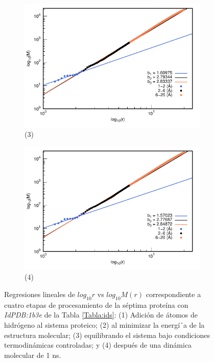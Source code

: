 \begin{figure}[H]
			\vspace{0cm} %
			
			\hspace{-0.3cm} 
			\begin{subfigure}{0.49\textwidth}
				\centering
				\includegraphics[width=\linewidth,page=1]{graphs/PDBs/1b3e/1b3eEq.pdf}
				\caption{(3)}
			\end{subfigure}
			\hspace{0.2cm}
			\begin{subfigure}{0.49\textwidth} %
				\centering
				\includegraphics[width=\linewidth,page=1]{graphs/PDBs/1b3e/1b3e1ns.pdf}
				\caption{(4)}
			\end{subfigure}
			\caption{Regresiones lineales de $log_{10}r$ vs $log_{10}M(r)$ correspondiente a cuatro etapas de procesamiento de la s\'{e}ptima prote\'{i}na con \textit{IdPDB:1b3e} de la Tabla \ref{Tabla:ids}: (1) Adici\'{o}n de \'{a}tomos de hidr\'{o}geno al sistema proteico; (2) al minimizar la energ\'{i´}a de la estructura molecular; (3) equilibrando el sistema bajo condiciones termodin\'{a}micas controladas; y (4) despu\'{e}s de una din\'{a}mica molecular de 1 ns.}
			\label{fig:1b3e}
		\end{figure}
		
